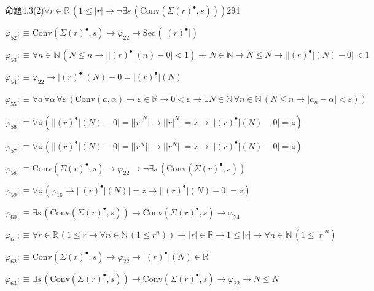 \begin{fullproof}{命題4.3(2)}{$\forall r \in \mathbb{R}\,(1 \leq \lvert r \rvert \to \neg \exists s\,(\mathrm{Conv}(\Sigma {(r)^{\bullet}},s)))$}{294}
\begin{abbrevlist}
\item $\varphi_{52} :\equiv \mathrm{Conv}(\Sigma {(r)^{\bullet}},s) \to \varphi_{22} \to \mathrm{Seq}(\lvert {(r)^{\bullet}} \rvert)$
\item $\varphi_{53} :\equiv \forall n \in \mathbb{N}\,(N \leq n \to \lvert \lvert {(r)^{\bullet}} \rvert(n) - 0 \rvert < 1) \to N \in \mathbb{N} \to N \leq N \to \lvert \lvert {(r)^{\bullet}} \rvert(N) - 0 \rvert < 1$
\item $\varphi_{54} :\equiv \varphi_{22} \to \lvert {(r)^{\bullet}} \rvert(N) - 0 = \lvert {(r)^{\bullet}} \rvert(N)$
\item $\varphi_{55} :\equiv \forall a\,\forall \alpha\,\forall \varepsilon\,(\mathrm{Conv}(a,\alpha) \to \varepsilon \in \mathbb{R} \to 0 < \varepsilon \to \exists N \in \mathbb{N}\,\forall n \in \mathbb{N}\,(N \leq n \to \lvert a_{n} - \alpha \rvert < \varepsilon))$
\item $\varphi_{56} :\equiv \forall z\,(\lvert \lvert {(r)^{\bullet}} \rvert(N) - 0 \rvert = \lvert {{\lvert r \rvert}^{N}} \rvert \to \lvert {{\lvert r \rvert}^{N}} \rvert = z \to \lvert \lvert {(r)^{\bullet}} \rvert(N) - 0 \rvert = z)$
\item $\varphi_{57} :\equiv \forall z\,(\lvert \lvert {(r)^{\bullet}} \rvert(N) - 0 \rvert = \lvert \lvert {{r}^{N}} \rvert \rvert \to \lvert \lvert {{r}^{N}} \rvert \rvert = z \to \lvert \lvert {(r)^{\bullet}} \rvert(N) - 0 \rvert = z)$
\item $\varphi_{58} :\equiv \mathrm{Conv}(\Sigma {(r)^{\bullet}},s) \to \varphi_{22} \to \neg \exists s\,(\mathrm{Conv}(\Sigma {(r)^{\bullet}},s))$
\item $\varphi_{59} :\equiv \forall z\,(\varphi_{16} \to \lvert \lvert {(r)^{\bullet}} \rvert(N) \rvert = z \to \lvert \lvert {(r)^{\bullet}} \rvert(N) - 0 \rvert = z)$
\item $\varphi_{60} :\equiv \exists s\,(\mathrm{Conv}(\Sigma {(r)^{\bullet}},s)) \to \mathrm{Conv}(\Sigma {(r)^{\bullet}},s) \to \varphi_{24}$
\item $\varphi_{61} :\equiv \forall r \in \mathbb{R}\,(1 \leq r \to \forall n \in \mathbb{N}\,(1 \leq {{r}^{n}})) \to \lvert r \rvert \in \mathbb{R} \to 1 \leq \lvert r \rvert \to \forall n \in \mathbb{N}\,(1 \leq {{\lvert r \rvert}^{n}})$
\item $\varphi_{62} :\equiv \mathrm{Conv}(\Sigma {(r)^{\bullet}},s) \to \varphi_{22} \to \lvert {(r)^{\bullet}} \rvert(N) \in \mathbb{R}$
\item $\varphi_{63} :\equiv \exists s\,(\mathrm{Conv}(\Sigma {(r)^{\bullet}},s)) \to \mathrm{Conv}(\Sigma {(r)^{\bullet}},s) \to \varphi_{22} \to N \leq N$

\end{abbrevlist}
\end{fullproof}
